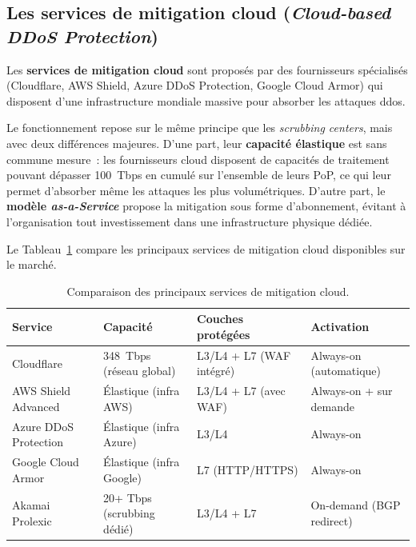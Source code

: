 \subsection{Les services de mitigation cloud (\textit{Cloud-based DDoS Protection})}

Les \textbf{services de mitigation cloud} sont proposés par des fournisseurs spécialisés (Cloudflare, AWS Shield, Azure DDoS Protection, Google Cloud Armor) qui disposent d'une infrastructure mondiale massive pour absorber les attaques \gls{ddos}.

Le fonctionnement repose sur le même principe que les \textit{scrubbing centers}, mais avec deux différences majeures. D'une part, leur \textbf{capacité élastique} est sans commune mesure~: les fournisseurs cloud disposent de capacités de traitement pouvant dépasser 100~Tbps en cumulé sur l'ensemble de leurs PoP, ce qui leur permet d'absorber même les attaques les plus volumétriques. D'autre part, le \textbf{modèle \textit{as-a-Service}} propose la mitigation sous forme d'abonnement, évitant à l'organisation tout investissement dans une infrastructure physique dédiée.

Le Tableau~\ref{tab:services_cloud} compare les principaux services de mitigation cloud disponibles sur le marché.

\begin{table}[H]
\centering
\caption{Comparaison des principaux services de mitigation cloud.}
\label{tab:services_cloud}
\small
\renewcommand{\arraystretch}{1.4}
\begin{tabularx}{\textwidth}{|l|X|X|X|}
\hline
\textbf{Service} & \textbf{Capacité} & \textbf{Couches protégées} & \textbf{Activation} \\
\hline
Cloudflare~\parencite{cloudflare2025}       & 348~Tbps (réseau global) & L3/L4 + L7 (WAF intégré) & Always-on (automatique) \\
\hline
AWS Shield Advanced~\parencite{awsshield2024} & Élastique (infra AWS) & L3/L4 + L7 (avec WAF) & Always-on + sur demande \\
\hline
Azure DDoS Protection~\parencite{azureddos2024} & Élastique (infra Azure) & L3/L4 & Always-on \\
\hline
Google Cloud Armor~\parencite{googlearmor2024} & Élastique (infra Google) & L7 (HTTP/HTTPS) & Always-on \\
\hline
Akamai Prolexic  & 20+ Tbps (scrubbing dédié) & L3/L4 + L7 & On-demand (BGP redirect) \\
\hline
\end{tabularx}
\end{table}

